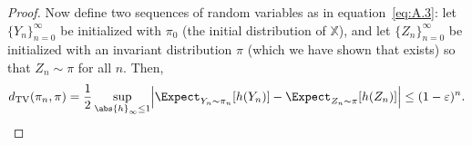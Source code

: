\begin{proof}
Now define two sequences of random variables as in equation~\eqref{eq:A.3}: let $\{Y_n\}_{n=0}^\infty$
be initialized with $\pi_0$ (the initial distribution of $\mathbb{X}$), and let $\{Z_n\}_{n=0}^\infty$
be initialized with an invariant distribution $\pi$ (which we have shown that exists) so that
$Z_n \sim \pi$ for all $n$.  Then,
\[
  d_{\mathrm{TV}}(\pi_n, \pi)
  = \frac{1}{2} \sup_{\abs{h}_\infty \leq 1}
    \Bigl|\Expect_{Y_n \sim \pi_n}[h(Y_n)] - \Expect_{Z_n \sim \pi}[h(Z_n)]\Bigr|
  \leq (1 - \varepsilon)^n. \qedhere
\]
\end{proof}
